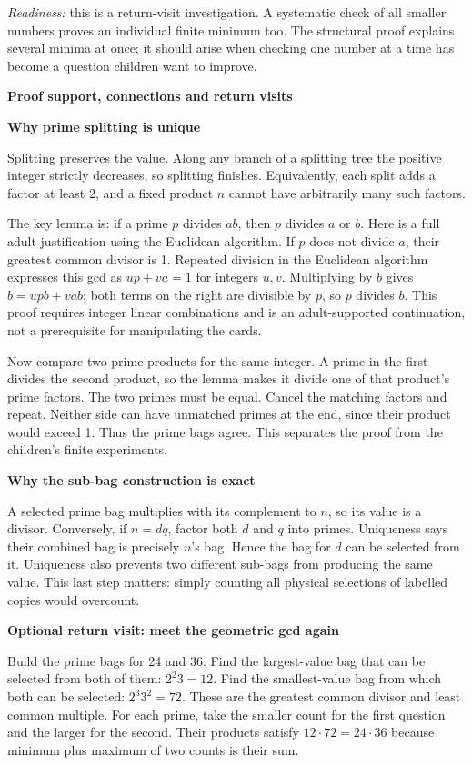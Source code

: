 \documentclass[11pt]{article}
\newcommand{\head}[1]{\par\textbf{\large #1}\par}
\newcommand{\sub}[1]{\par\textbf{#1}\par}
\begin{document}
\emph{Readiness:} this is a return-visit investigation. A systematic check of all smaller numbers proves an individual finite minimum too. The structural proof explains several minima at once; it should arise when checking one number at a time has become a question children want to improve.
\newpage
\head{Proof support, connections and return visits}
\sub{Why prime splitting is unique}
Splitting preserves the value. Along any branch of a splitting tree the positive integer strictly decreases, so splitting finishes. Equivalently, each split adds a factor at least 2, and a fixed product $n$ cannot have arbitrarily many such factors.

The key lemma is: if a prime $p$ divides $ab$, then $p$ divides $a$ or $b$. Here is a full adult justification using the Euclidean algorithm. If $p$ does not divide $a$, their greatest common divisor is 1. Repeated division in the Euclidean algorithm expresses this gcd as $up+va=1$ for integers $u,v$. Multiplying by $b$ gives $b=upb+vab$; both terms on the right are divisible by $p$, so $p$ divides $b$. This proof requires integer linear combinations and is an adult-supported continuation, not a prerequisite for manipulating the cards.

Now compare two prime products for the same integer. A prime in the first divides the second product, so the lemma makes it divide one of that product's prime factors. The two primes must be equal. Cancel the matching factors and repeat. Neither side can have unmatched primes at the end, since their product would exceed 1. Thus the prime bags agree. This separates the proof from the children's finite experiments.

\sub{Why the sub-bag construction is exact}
A selected prime bag multiplies with its complement to $n$, so its value is a divisor. Conversely, if $n=dq$, factor both $d$ and $q$ into primes. Uniqueness says their combined bag is precisely $n$'s bag. Hence the bag for $d$ can be selected from it. Uniqueness also prevents two different sub-bags from producing the same value. This last step matters: simply counting all physical selections of labelled copies would overcount.

\sub{Optional return visit: meet the geometric gcd again}
Build the prime bags for 24 and 36. Find the largest-value bag that can be selected from both of them: $2^2 3=12$. Find the smallest-value bag from which both can be selected: $2^3 3^2=72$. These are the greatest common divisor and least common multiple. For each prime, take the smaller count for the first question and the larger for the second. Their products satisfy $12\cdot72=24\cdot36$ because minimum plus maximum of two counts is their sum.
\end{document}
